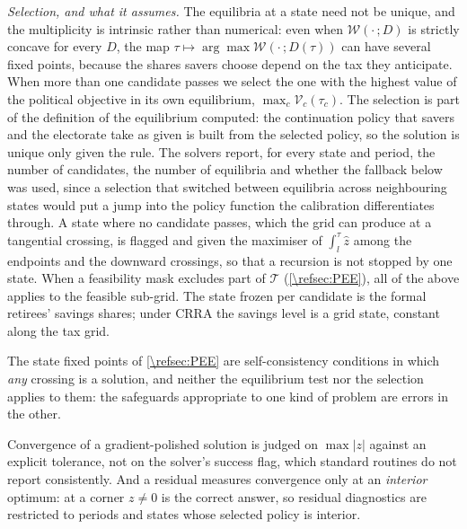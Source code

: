 \emph{Selection, and what it assumes.} The equilibria at a state need not be unique, and the multiplicity is intrinsic rather than numerical: even when $\mathcal{W}(\cdot\,;D)$ is strictly concave for every $D$, the map $\tau\mapsto\arg\max\mathcal{W}(\cdot\,;D(\tau))$ can have several fixed points, because the shares savers choose depend on the tax they anticipate. When more than one candidate passes we select the one with the highest value of the political objective in its own equilibrium, $\max_c \mathcal{V}_c(\tau_c)$. The selection is part of the definition of the equilibrium computed: the continuation policy that savers and the electorate take as given is built from the selected policy, so the solution is unique only given the rule. The solvers report, for every state and period, the number of candidates, the number of equilibria and whether the fallback below was used, since a selection that switched between equilibria across neighbouring states would put a jump into the policy function the calibration differentiates through. A state where no candidate passes, which the grid can produce at a tangential crossing, is flagged and given the maximiser of $\int_l^{\tau}\hat{z}$ among the endpoints and the downward crossings, so that a recursion is not stopped by one state. When a feasibility mask excludes part of $\mathcal{T}$ (\cref{\refsec:PEE}), all of the above applies to the feasible sub-grid. The state frozen per candidate is the formal retirees' savings shares; under CRRA the savings level is a grid state, constant along the tax grid.

The state fixed points of \cref{\refsec:PEE} are self-consistency conditions in which \emph{any} crossing is a solution, and neither the equilibrium test nor the selection applies to them: the safeguards appropriate to one kind of problem are errors in the other.

Convergence of a gradient-polished solution is judged on $\max\left|z\right|$ against an explicit tolerance, not on the solver's success flag, which standard routines do not report consistently. And a residual measures convergence only at an \emph{interior} optimum: at a corner $z\neq 0$ is the correct answer, so residual diagnostics are restricted to periods and states whose selected policy is interior.
